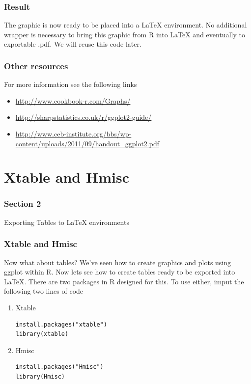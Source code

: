 \documentclass[nogin]{beamer}\usepackage[]{graphicx}\usepackage[]{color}
\begin{document}
\begin{frame}
\frametitle{Result}
The graphic is now ready to be placed into a LaTeX environment. No additional wrapper is necessary to bring this graphic from R into LaTeX and eventually to exportable .pdf. We will reuse this code later.
\end{frame}

\begin{frame}[fragile]
\frametitle{Other resources}
For more information see the following links
\begin{itemize}
\item \url{http://www.cookbook-r.com/Graphs/}
\item \url{http://sharpstatistics.co.uk/r/ggplot2-guide/}
\item \url{http://www.ceb-institute.org/bbs/wp-content/uploads/2011/09/handout_ggplot2.pdf}
\end{itemize}
\end{frame}

\section{Xtable and Hmisc}
\begin{frame}
\frametitle{Section 2}
\begin{center}
\Large
Exporting Tables to LaTeX environments
\end{center}
\end{frame}

\begin{frame}[fragile]
\frametitle{Xtable and Hmisc}
\begin{block}{Now what about tables?}
We've seen how to create graphics and plots using ggplot within R. Now lets see how to create tables ready to be exported into LaTeX. There are two packages in R designed for this. To use either, imput the following two lines of code
\begin{enumerate}
\item Xtable
\begin{verbatim}install.packages("xtable")
library(xtable)\end{verbatim}
\item Hmisc
\begin{verbatim}install.packages("Hmisc")
library(Hmisc)\end{verbatim}
\end{enumerate}
\end{block}
\end{frame}
\end{document}
